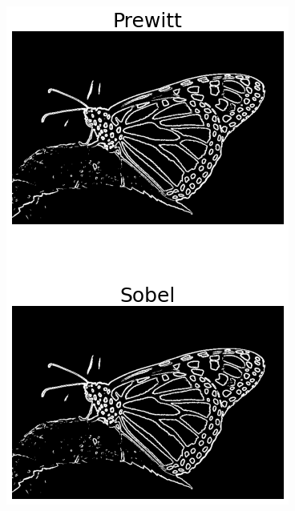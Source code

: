 \documentclass[9pt, aspectratio=169]{beamer}
\begin{document}
\begin{frame}
\begin{columns}
\begin{column}{.4\textwidth}
            \includegraphics[width=.7\textwidth]{monarch_prewitt_sobel.png}
        \end{column}
    \end{columns}
\end{frame}






\end{document}
